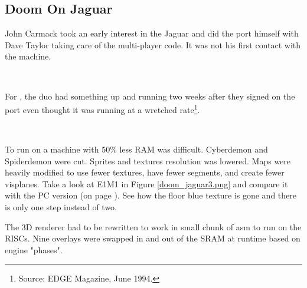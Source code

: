\subsection{Doom On Jaguar}
John Carmack took an early interest in the Jaguar and did the port himself with Dave Taylor taking care of the multi-player code. It was not his first contact with the machine.\\
\par
{}\\
\par
For \doom, the duo had something up and running two weeks after they signed on the port even thought it was running at a wretched rate\footnote{Source: EDGE Magazine, June 1994.}.\\
\par
{}\\
\par
To run on a machine with 50\% less RAM was difficult. Cyberdemon and Spiderdemon were cut. Sprites and textures resolution was lowered. Maps were heavily modified to use fewer textures, have fewer segments, and create fewer visplanes. Take a look at E1M1 in Figure \ref{doom_jaguar3.png} and compare it with the PC version (on page \pageref{mashed_potatoes1.png}). See how  the floor blue texture is gone and there is only one step instead of two.\\
\par
The 3D renderer had to be rewritten to work in small chunk of asm to run on the RISCs. Nine overlays were swapped in and out of the SRAM at runtime based on engine "phases".\\
\par
{}
\par
\vspace{-12pt}
